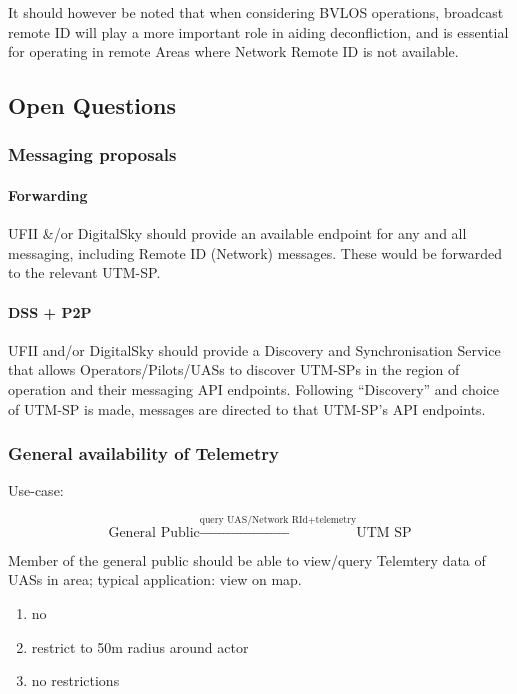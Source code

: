 \documentclass{ua_wgs_base}
\begin{document}
It should however be noted that when considering BVLOS operations,
broadcast remote ID will play a more important role in aiding deconfliction,
and is essential for operating in remote Areas where Network Remote
ID is not available. 


\subsection{Open Questions}

\subsubsection{Messaging proposals}

\paragraph{Forwarding}

UFII \&/or DigitalSky should provide an available endpoint for any
and all messaging, including Remote ID (Network) messages. These would
be forwarded to the relevant UTM-SP.

\paragraph{DSS + P2P}

UFII and/or DigitalSky should provide a Discovery and Synchronisation
Service that allows Operators/Pilots/UASs to discover UTM-SPs in the
region of operation and their messaging API endpoints. Following ``Discovery''
and choice of UTM-SP is made, messages are directed to that UTM-SP's
API endpoints.

\subsubsection{General availability of Telemetry\label{subsec:availability-Telemetry}}

Use-case: 

\[
\text{General Public}\ensuremath{\xrightarrow{\text{query UAS/Network RId+telemetry}}}\text{UTM SP}
\]
 

Member of the general public should be able to view/query Telemtery
data of UASs in area; typical application: view on map.
\begin{enumerate}
\item no
\item restrict to 50m radius around actor
\item no restrictions
\end{enumerate}
\end{document}
